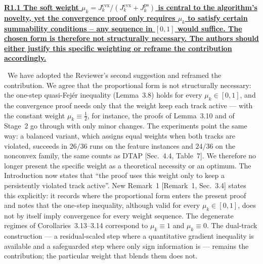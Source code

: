 \documentclass[11pt]{article}
\newcommand{\response}[1]{\smallskip\noindent{\color{blue!60!black}\textbf{Response.}}\ #1\par\medskip}
\newcommand{\loc}[1]{\textcolor{blue!50!black}{[#1]}}
\newenvironment{point}[1]{\medskip\noindent\textbf{\uline{#1}}\par}{\par}
\begin{document}
\begin{point}{R1.1 The soft weight $\mu_k=J_k^{\mathrm{cvx}}/(J_k^{\mathrm{cvx}}+J_k^{\mathrm{ps}})$
is central to the algorithm's novelty, yet the convergence proof only requires $\mu_k$ to
satisfy certain summability conditions -- any sequence in $[0,1]$ would suffice. The chosen
form is therefore not structurally necessary. The authors should either justify this
specific weighting or reframe the contribution accordingly.}
\response{We have adopted the Reviewer's second suggestion and reframed the contribution.
We agree that the proportional form is not structurally necessary: the one-step
quasi-Fej\'er inequality (Lemma~3.8) holds for every $\mu_k\in[0,1]$, and the convergence
proof needs only that the weight keep each track active --- with the constant weight
$\mu_k\equiv\tfrac12$, for instance, the proofs of Lemma~3.10 and of Stage~2 go through with
only minor changes. The experiments point the same way: a balanced variant, which assigns
equal weights when both tracks are violated, succeeds in $26/36$ runs on the feature
instances and $24/36$ on the nonconvex family, the same counts as DTAP \loc{Sec.~4.4,
Table~7}. We therefore no longer present the specific weight as a theoretical necessity or
an optimum. The Introduction now states that ``the proof uses this weight only to keep a
persistently violated track active''. New Remark~1 \loc{Remark~1, Sec.~3.4} states this explicitly: it records where
the proportional form enters the present proof and notes that the one-step inequality,
although valid for every $\mu_k\in[0,1]$, does not by itself imply convergence for every
weight sequence. The degenerate regimes of Corollaries~3.13--3.14 correspond to
$\mu_k\equiv1$ and $\mu_k\equiv0$. The dual-track
construction --- a residual-scaled step where a quantitative gradient inequality is
available and a safeguarded step where only sign information is --- remains the
contribution; the particular weight that blends them does not.}
\end{point}
\end{document}
